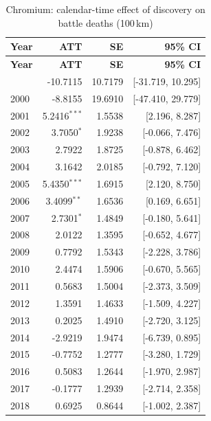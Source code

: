 \begin{longtable}{lrrr}
\caption{Chromium: calendar-time effect of discovery on battle deaths (100\,km)} \label{tab:cal_chromium} \\
\toprule
\textbf{Year} & \textbf{ATT} & \textbf{SE} & \textbf{95\% CI} \\
\midrule \endfirsthead
\toprule
\textbf{Year} & \textbf{ATT} & \textbf{SE} & \textbf{95\% CI} \\
\midrule \endhead
\bottomrule \endlastfoot
1999 & -10.7115 & 10.7179 & [-31.719, 10.295] \\
2000 & -8.8155 & 19.6910 & [-47.410, 29.779] \\
2001 & 5.2416$^{***}$ & 1.5538 & [2.196, 8.287] \\
2002 & 3.7050$^{*}$ & 1.9238 & [-0.066, 7.476] \\
2003 & 2.7922 & 1.8725 & [-0.878, 6.462] \\
2004 & 3.1642 & 2.0185 & [-0.792, 7.120] \\
2005 & 5.4350$^{***}$ & 1.6915 & [2.120, 8.750] \\
2006 & 3.4099$^{**}$ & 1.6536 & [0.169, 6.651] \\
2007 & 2.7301$^{*}$ & 1.4849 & [-0.180, 5.641] \\
2008 & 2.0122 & 1.3595 & [-0.652, 4.677] \\
2009 & 0.7792 & 1.5343 & [-2.228, 3.786] \\
2010 & 2.4474 & 1.5906 & [-0.670, 5.565] \\
2011 & 0.5683 & 1.5004 & [-2.373, 3.509] \\
2012 & 1.3591 & 1.4633 & [-1.509, 4.227] \\
2013 & 0.2025 & 1.4910 & [-2.720, 3.125] \\
2014 & -2.9219 & 1.9474 & [-6.739, 0.895] \\
2015 & -0.7752 & 1.2777 & [-3.280, 1.729] \\
2016 & 0.5083 & 1.2644 & [-1.970, 2.987] \\
2017 & -0.1777 & 1.2939 & [-2.714, 2.358] \\
2018 & 0.6925 & 0.8644 & [-1.002, 2.387] \\
\end{longtable}
